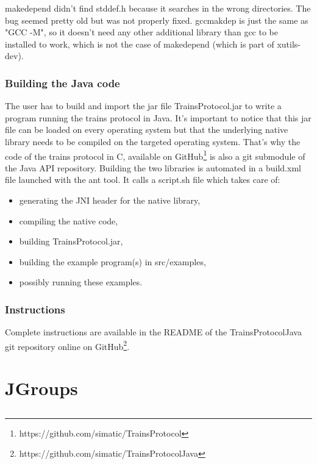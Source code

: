 \documentclass[a4paper,10pt]{report}
\begin{document}
makedepend didn't find stddef.h because it searches in the wrong directories.
    The bug seemed pretty old but was not properly fixed.
    gccmakdep is just the same as "GCC -M", so it doesn't need any
    other additional library than gcc to be installed to work, which is not
    the case of makedepend (which is part of xutils-dev).

\subsection{Building the Java code}

The user has to build and import the jar file TrainsProtocol.jar to write a program running the trains protocol in Java.
It's important to notice that this jar file can be loaded on every operating system but that the underlying native library needs to be compiled on the targeted operating system.
That's why the code of the trains protocol in C, available on GitHub\footnote{https://github.com/simatic/TrainsProtocol} is also a git submodule of the Java API repository.
Building the two libraries is automated in a build.xml file launched with the ant tool. It calls a script.sh file which takes care of: 
\begin{itemize}
\item generating the JNI header for the native library, 
\item compiling the native code,
\item building TrainsProtocol.jar,
\item building the example program(s) in src/examples,
\item possibly running these examples.
\end{itemize}        

\subsection{Instructions}

Complete instructions are available in the README of the TrainsProtocolJava git repository online on GitHub\footnote{https://github.com/simatic/TrainsProtocolJava}.

\chapter{JGroups}
\section{}
\end{document}
